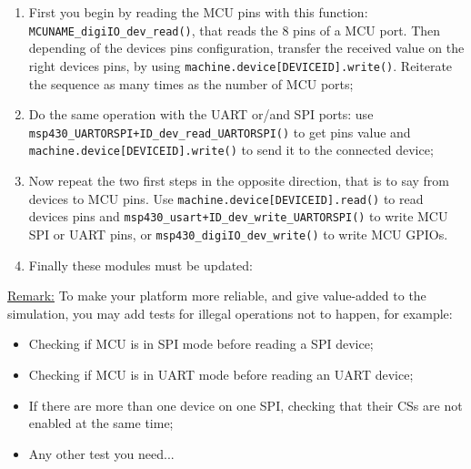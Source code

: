\documentclass[a4paper,10pt]{report}
\begin{document}
\begin{enumerate}
  \item First you begin by reading the MCU pins with this function: \verb$MCUNAME_digiIO_dev_read()$, that reads the 8 pins of a MCU port. Then depending of the devices pins configuration, transfer the received value on the right devices pins, by using \verb$machine.device[DEVICEID].write()$. Reiterate the sequence as many times as the number of MCU ports;
  \item Do the same operation with the UART or/and SPI ports: use \verb$msp430_UARTORSPI+ID_dev_read_$\linebreak\verb$UARTORSPI()$ to get pins value and \verb$machine.device[DEVICEID].write()$ to send it to the connected device;
  \item Now repeat the two first steps in the opposite direction, that is to say from devices to MCU pins. Use  \verb$machine.device[DEVICEID].read()$ to read devices pins and \verb$msp430_usart+ID_dev_write_$\linebreak\verb$UARTORSPI()$ to write MCU SPI or UART pins, or \verb$msp430_digiIO_dev_write()$ to write MCU GPIOs.
  \item Finally these modules must be updated:
\end{enumerate}

\noindent\underline{Remark:} To make your platform more reliable, and give value-added to the simulation, you may add tests for illegal operations not to happen, for example:
\begin{itemize}
  \item Checking if MCU is in SPI mode before reading a SPI device;
  \item Checking if MCU is in UART mode before reading an UART device;
  \item If there are more than one device on one SPI, checking that their CSs are not enabled at the same time;
  \item Any other test you need...
\end{itemize}
\end{document}

